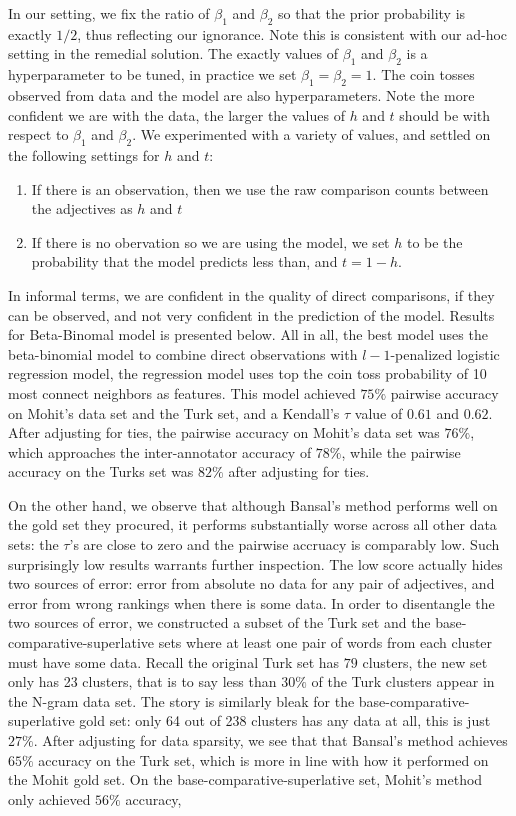 In our setting, we fix the ratio of $\beta_1$ and $\beta_2$ so that the prior probability is exactly $1/2$, thus reflecting our ignorance. Note this is consistent with our ad-hoc setting in the remedial solution. The exactly values of $\beta_1$ and $\beta_2$ is a hyperparameter to be tuned, in practice we set $\beta_1 = \beta_2 = 1$. The coin tosses observed from data and the model are also hyperparameters. Note the more confident we are with the data, the larger the values of $h$ and $t$ should be with respect to $\beta_1$ and $\beta_2$. We experimented with a variety of values, and settled on the following settings for $h$ and $t$:
	\begin{enumerate}
		\item If there is an observation, then we use the raw comparison counts between the adjectives as $h$ and $t$
		\item If there is no obervation so we are using the model, we set $h$ to be the probability that the model predicts less than, and $t = 1 - h$.
	\end{enumerate}

In informal terms, we are confident in the quality of direct comparisons, if they can be observed, and not very confident in the prediction of the model. Results for Beta-Binomal model is presented below.  All in all, the best model uses the beta-binomial model to combine direct observations with $l-1$-penalized logistic regression model, the regression model uses top the coin toss probability of 10 most connect neighbors as features. This model achieved $75\%$ pairwise accuracy on Mohit's data set and the Turk set, and a Kendall's $\tau$ value of $0.61$ and $0.62$. After adjusting for ties, the pairwise accuracy on Mohit's data set was $76\%$, which approaches the inter-annotator accuracy of $78\%$, while the pairwise accuracy on the Turks set was $82\%$ after adjusting for ties. 

On the other hand, we observe that although Bansal's method performs well on the gold set they procured, it performs substantially worse across all other data sets: the $\tau$'s are close to zero and the pairwise accruacy is comparably low. Such surprisingly low results warrants further inspection. The low score actually hides two sources of error: error from absolute no data for any pair of adjectives, and error from wrong rankings when there is some data. In order to disentangle the two sources of error, we constructed a subset of the Turk set and the base-comparative-superlative sets where at least one pair of words from each cluster must have some data. Recall the original Turk set has $79$ clusters, the new set only has 23 clusters, that is to say less than $30\%$ of the Turk clusters appear in the N-gram data set. The story is similarly bleak for the base-comparative-superlative gold set: only 64 out of 238 clusters has any data at all, this is just $27\%$. After adjusting for data sparsity, we see that that Bansal's method achieves $65\%$ accuracy on the Turk set, which is more in line with how it performed on the Mohit gold set. On the base-comparative-superlative set, Mohit's method only achieved $56\%$ accuracy, 

